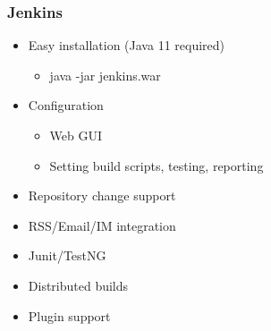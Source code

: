 \documentclass[10pt,xcolor=pdflatex]{beamer}
\begin{document}
\begin{frame}\frametitle{Jenkins}
\begin{itemize}
	\item Easy installation (Java 11 required)
	  \begin{itemize}
	    \item java -jar jenkins.war
	  \end{itemize}
    \item Configuration
      \begin{itemize}
        \item Web GUI
        \item Setting build scripts, testing, reporting
      \end{itemize}
    \item Repository change support
	\item RSS/Email/IM integration
	\item Junit/TestNG
	\item Distributed builds
	\item Plugin support
\end{itemize}
\end{frame}
\end{document}
